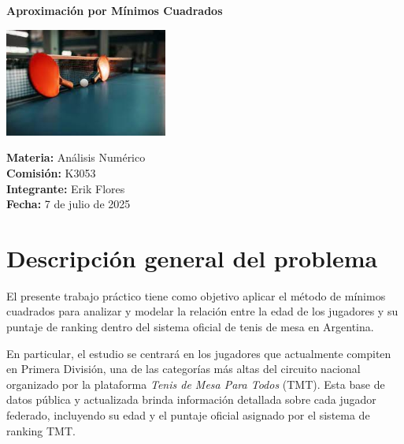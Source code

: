 \documentclass[12pt]{article}
\begin{document}
\begin{titlepage}
    \begin{center}
        
        {\Huge\bfseries Aproximación por Mínimos Cuadrados}
        \vspace*{2cm}

        
        \includegraphics[width=0.4\textwidth]{"paleta.jpeg"}
        
        \vspace*{4cm}
        
        
        \begin{flushleft}
            {\large\textbf{Materia:} Análisis Numérico}\\[0.5cm]

            {\large\textbf{Comisión:} K3053}\\[0.5cm]

            {\large\textbf{Integrante:} Erik Flores} \\[0.5cm]

            {\large\textbf{Fecha:} 7 de julio de 2025}\\
        \end{flushleft}
        
        \vfill
        
    \end{center}
\end{titlepage}

\newpage
\pagestyle{plain}  
    \newpage
    \section*{Descripción general del problema }

    El presente trabajo práctico tiene como objetivo aplicar el método de mínimos cuadrados para analizar y modelar la relación entre la edad de los jugadores y su puntaje de ranking dentro del sistema oficial de tenis de mesa en Argentina.

    En particular, el estudio se centrará en los jugadores que actualmente compiten en Primera División, una de las categorías más altas del circuito nacional organizado por la plataforma \textit{Tenis de Mesa Para Todos} (TMT). Esta base de datos pública y actualizada brinda información detallada sobre cada jugador federado, incluyendo su edad y el puntaje oficial asignado por el sistema de ranking TMT.
\end{document}
